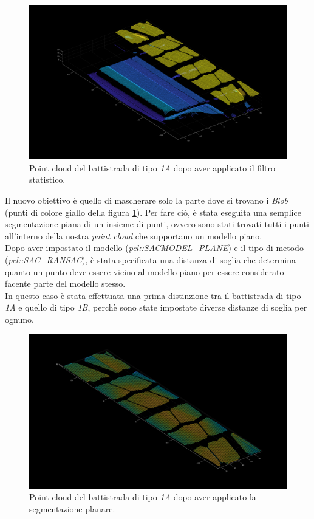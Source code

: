 \begin{figure}[H]
	\centering
	\includegraphics[width=0.8\columnwidth]{./pictures/batt_1a_analisi_2.png}
	\caption{Point cloud del battistrada di tipo \textit{1A} dopo aver applicato il filtro statistico.}\label{fig:batt_1a_analisi_2}
\end{figure}

\noindent Il nuovo obiettivo è quello di mascherare solo la parte dove si trovano i \textit{Blob} (punti di colore giallo della figura \ref{fig:batt_1a_analisi_2}). Per fare ciò, è stata eseguita una semplice segmentazione piana di un insieme di punti, ovvero sono stati trovati tutti i punti all'interno della nostra \textit{point cloud} che supportano un modello piano.\\
\newline
Dopo aver impostato il modello (\textit{pcl::SACMODEL\_PLANE}) e il tipo di metodo (\textit{pcl::SAC\_RANSAC}), è stata specificata una distanza di soglia che determina quanto un punto deve essere vicino al modello piano per essere considerato facente parte del modello stesso.\\
\newline
In questo caso è stata effettuata una prima distinzione tra il battistrada di tipo \textit{1A} e quello di tipo \textit{1B}, perchè sono state impostate diverse distanze di soglia per ognuno.

\begin{figure}[H]
	\centering
	\includegraphics[width=0.8\columnwidth]{./pictures/batt_1a_analisi_3.png}
	\caption{Point cloud del battistrada di tipo \textit{1A} dopo aver applicato la segmentazione planare.}\label{fig:batt_1a_analisi_3}
\end{figure}

